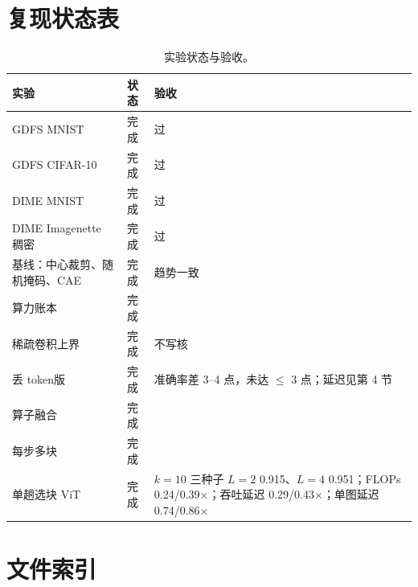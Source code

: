 \documentclass[11pt,a4paper,UTF8,fontset=none]{ctexart}
\newcommand{\tokdrop}{丢 token}
\newcommand{\onepass}{单趟选块 ViT}
\begin{document}
\section{复现状态表}

\begin{table}[H]
\centering
\caption{实验状态与验收。}
\small
\small
\begin{tabular}{>{\raggedright\arraybackslash}p{4.8cm}>{\raggedright\arraybackslash}p{1.3cm}>{\raggedright\arraybackslash}p{8.6cm}}
\toprule
实验 & 状态 & 验收 \\
\midrule
GDFS MNIST & 完成 & 过 \\
GDFS CIFAR-10 & 完成 & 过 \\
DIME MNIST & 完成 & 过 \\
DIME Imagenette 稠密 & 完成 & 过 \\
基线：中心裁剪、随机掩码、CAE & 完成 & 趋势一致 \\
算力账本 & 完成 & \\
稀疏卷积上界 & 完成 & 不写核 \\
\tokdrop{}版 & 完成 & 准确率差 3--4 点，未达 $\leq$ 3 点；延迟见第 4 节 \\
算子融合 & 完成 & \\
每步多块 & 完成 & \\
\onepass{} & 完成 & $k=10$ 三种子 $L=2$ 0.915、$L=4$ 0.951；FLOPs 0.24/0.39$\times$；吞吐延迟 0.29/0.43$\times$；单图延迟 0.74/0.86$\times$ \\
\bottomrule
\end{tabular}
\end{table}

\section{文件索引}
\end{document}
